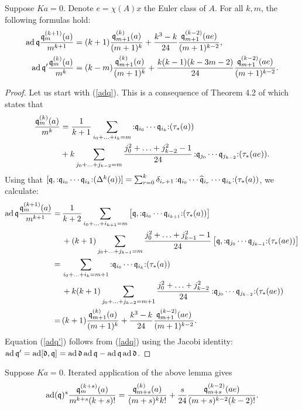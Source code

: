 \begin{lemma}
Suppose $Ka=0$. 
Denote $e=\chi(A)x$ the Euler class of $A$.
For all $k,m$, the following formulas hold:
\begin{align}
\label{adq}
\operatorname{ad} \mathfrak{q}  \frac{\mathfrak{q}_m^{(k+1)}(a)}{m^{k+1}} & = (k+1)  \frac{\mathfrak{q}_{m+1}^{(k)}(a)}{(m+1)^{k}} + \frac{k^3-k}{24}\frac{\mathfrak{q}_{m+1}^{(k-2)}(ae)}{(m+1)^{k-2}} , \\
\label{adq'}
\operatorname{ad} \mathfrak{q}' \frac{\mathfrak{q}_m^{(k)}(a)}{m^k} & = (k-m) \frac{\mathfrak{q}_{m+1}^{(k)}(a)}{(m+1)^k}+ \frac{k(k-1)(k-3m-2)}{24}\frac{\mathfrak{q}_{m+1}^{(k-2)}(ae)}{(m+1)^{k-2}} .
\end{align}
\end{lemma}
\begin{proof}
Let us start with (\ref{adq}). This is a consequence of Theorem 4.2 of \cite{LiQinWang2} which states that 
\begin{align*}
\frac{\mathfrak{q}_m^{(k)}(a)}{m^k}
& = \frac{1}{k+1}\sum_{i_0+\ldots+i_k=m} \mathop{:}\nolimits\! \mathfrak{q}_{i_0}\cdots \mathfrak{q}_{i_k} \!\mathop{:}\nolimits  (\tau_*(a)) \\
& +  k \sum_{j_0+\ldots+j_{k-2}=m} \frac{j_0^2+\ldots+j_{k-2}^2-1}{24}\mathop{:}\nolimits\! \mathfrak{q}_{j_0}\cdots \mathfrak{q}_{j_{k-2}} \!\mathop{:}\nolimits  (\tau_*(ae)) .
\end{align*}
Using that 
$[\mathfrak{q},\mathop{:}\nolimits\! \mathfrak{q}_{i_0}\cdots \mathfrak{q}_{i_k} \!\mathop{:}\nolimits  (\Delta^k(a)) ] = \sum_{r=0}^k \delta_{i_r+1} \mathop{:}\nolimits\!\mathfrak{q}_{i_0}\cdots \widehat{\mathfrak{q}}_{i_r} \cdots \mathfrak{q}_{i_k} \!\mathop{:}\nolimits (\tau_*(a))$, 
we calculate:
\begin{align*}
\ad\q \frac{\q_m^{(k+1)}(a)}{m^{k+1}} 
  =\, &\frac{1}{k+2}\sum_{i_0+\ldots+i_{k+1}=m} \left[\q,\nor \q_{i_0}\cdots \q_{i_{k+1}} \mal (\tau_*(a))\right] \\
 & + (k+1) \sum_{j_0+\ldots+j_{k-1}=m} \frac{j_0^2+\ldots+j_{k-1}^2-1}{24}\left[\q,\nor \q_{j_0}\cdots \q_{j_{k-1}} \mal (\tau_*(ae)) \right]\\
  =\, & \sum_{i_0+\ldots+i_{k}=m+1} \nor \q_{i_0}\cdots \q_{i_{k}} \mal  (\tau_*(a)) \\
 & + k(k+1) \sum_{j_0+\ldots+j_{k-2}=m+1} \frac{j_0^2+\ldots+j_{k-2}^2}{24}\nor \q_{j_0}\cdots \q_{j_{k-2}} \mal (\tau_*(ae)) \\
  =\, & (k+1)  \frac{\q_{m+1}^{(k)}(a)}{(m+1)^{k}} + \frac{k^3-k}{24}\frac{\q_{m+1}^{(k-2)}(ae)}{(m+1)^{k-2}}.
\end{align*}
Equation (\ref{adq'}) follows from (\ref{adq}) using the Jacobi identity: $\operatorname{ad} \mathfrak{q}' = \operatorname{ad} [\mathfrak d,\mathfrak{q}] = \operatorname{ad} \mathfrak d  \operatorname{ad} \mathfrak{q} - \operatorname{ad} \mathfrak{q}\operatorname{ad} \mathfrak d  $.
\end{proof}
\begin{corollary} \label{adqCorollary}
Suppose $Ka=0$.
Iterated application of the above lemma gives
 \begin{equation}
 \operatorname{ad}(\mathfrak{q})^s \frac{\mathfrak{q}_{m}^{(k+s)}(a)}{m^{k+s}(k+s)!} =\frac{\mathfrak{q}_{m+s}^{(k)}(a)}{(m+s)^kk!} + \frac{s}{24}\frac{\mathfrak{q}_{m+s}^{(k-2)}(ae)}{(m+s)^{k-2}(k-2)!}.
\end{equation}
\end{corollary}


